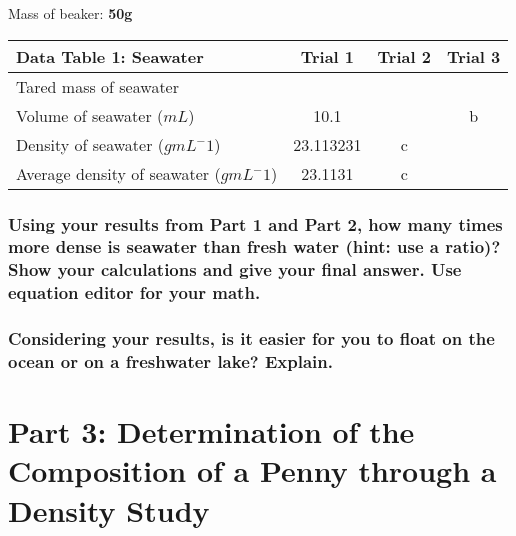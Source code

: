 \documentclass[a4paper,10pt]{article}
\begin{document}
        Mass of beaker: \textbf{50g}

        \begin{table}[h!]
            \label{tab:table1}
            \begin{tabular}{|l|c|c|c|}
                \hline
                \textbf{Data Table 1: Seawater} & \textbf{Trial 1} & \textbf{Trial 2} & \textbf{Trial 3}\\
                \hline
                Tared mass of seawater & & & \\
                \hline
                Volume of seawater ($mL$) & 10.1 & & b \\
                \hline
                Density of seawater ($g mL ^ -1$) & 23.113231 & c & \\
                \hline
                Average density of seawater ($g mL ^ -1$) & 23.1131 & c & \\
                \hline
            \end{tabular}
        \end{table}

        \subsubsection{Using your results from Part 1 and Part 2, how many times more dense is seawater than fresh water (hint: use a ratio)? Show your calculations and give your final answer. Use equation editor for your math.}

        \subsubsection{Considering your results, is it easier for you to float on the ocean or on a freshwater lake? Explain.}
    
    \section{Part 3: Determination of the Composition of a Penny through a Density Study}
\end{document}
